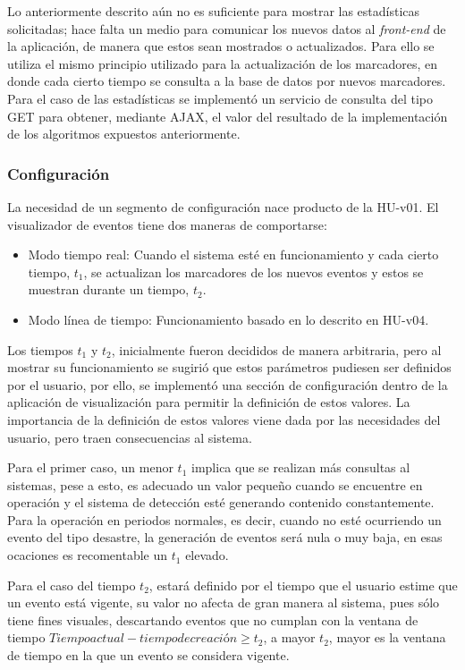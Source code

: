 Lo anteriormente descrito aún no es suficiente para mostrar las estadísticas solicitadas; hace falta un medio para comunicar los nuevos datos al \textit{front-end} de la aplicación, de manera que estos sean mostrados o actualizados. Para ello se utiliza el mismo principio utilizado para la actualización de los marcadores, en donde cada cierto tiempo se consulta a la base de datos por nuevos marcadores. Para el caso de las estadísticas se implementó un servicio de consulta del tipo GET para obtener, mediante AJAX, el valor del resultado de la implementación de los algoritmos expuestos anteriormente.

\subsubsection*{Configuración}
\label{subsubsec:config}

La necesidad de un segmento de configuración nace producto de la HU-v01. El visualizador de eventos tiene dos maneras de comportarse:

\begin{itemize}
\item Modo tiempo real: Cuando el sistema esté en funcionamiento y cada cierto tiempo, $t_{1}$, se actualizan los marcadores de los nuevos eventos y estos se muestran durante un tiempo, $t_{2}$.
\item Modo línea de tiempo: Funcionamiento basado en lo descrito en HU-v04.
\end{itemize}

Los tiempos $t_{1}$ y $t_{2}$, inicialmente fueron decididos de manera arbitraria, pero al mostrar su funcionamiento se sugirió que estos parámetros pudiesen ser definidos por el usuario, por ello, se implementó una sección de configuración dentro de la aplicación de visualización para permitir la definición de estos valores. La importancia de la definición de estos valores viene dada por las necesidades del usuario, pero traen consecuencias al sistema.

Para el primer caso, un menor $t_{1}$ implica que se realizan más consultas al sistemas, pese a esto, es adecuado un valor pequeño cuando se encuentre en operación y el sistema de detección esté generando contenido constantemente. Para la operación en periodos normales, es decir, cuando no esté ocurriendo un evento del tipo desastre, la generación de eventos será nula o muy baja, en esas ocaciones es recomentable un $t_{1}$ elevado.

Para el caso del tiempo $t_{2}$, estará definido por el tiempo que el usuario estime que un evento está vigente, su valor no afecta de gran manera al sistema, pues sólo tiene fines visuales, descartando eventos que no cumplan con la ventana de tiempo $Tiempo actual - tiempo de creación \geq t_{2}$, a mayor $t_{2}$, mayor es la ventana de tiempo en la que un evento se considera vigente.

